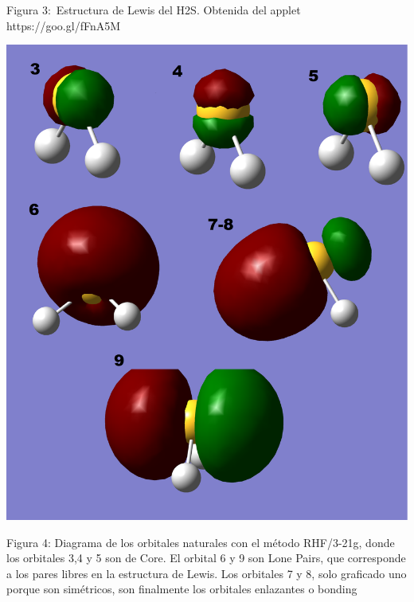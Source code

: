 \documentclass[]{article}
\begin{document}
{Figura 3:}{~Estructura de Lewis del H}{2}{S. Obtenida del applet
https://goo.gl/fFnA5M}

{}

{\includegraphics{images/image4.png}}

{Figura 4: }{Diagrama de los orbitales naturales con el método
RHF/3-21g, donde los orbitales 3,4 y 5 son de Core. El orbital 6 y 9 son
Lone Pairs, que corresponde a los pares libres en la estructura de
Lewis. Los orbitales 7 y 8, solo graficado uno porque son simétricos,
son finalmente los orbitales enlazantes o }{bonding}

{}

\protect\hypertarget{t.699ec4088e819c261a6f6322d85d42212259f0cf}{}{}\protect\hypertarget{t.7}{}{}
\end{document}
